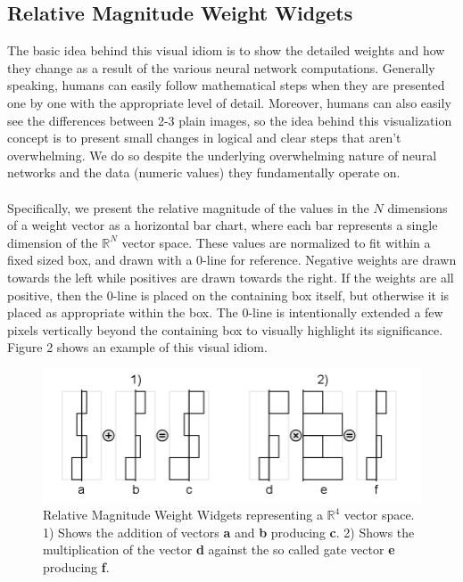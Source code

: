 \documentclass[journal]{vgtc}                %
\begin{document}
\subsection{Relative Magnitude Weight Widgets}
The basic idea behind this visual idiom is to show the detailed weights and how they change as a result of the various neural network computations.
Generally speaking, humans can easily follow mathematical steps when they are presented one by one with the appropriate level of detail.
Moreover, humans can also easily see the differences between 2-3 plain images, so the idea behind this visualization concept is to present small changes in logical and clear steps that aren't overwhelming.
We do so despite the underlying overwhelming nature of neural networks and the data (numeric values) they fundamentally operate on.
\\
\\
Specifically, we present the relative magnitude of the values in the $N$ dimensions of a weight vector as a horizontal bar chart, where each bar represents a single dimension of the $\mathbb{R}^N$ vector space.
These values are normalized to fit within a fixed sized box, and drawn with a 0-line for reference.
Negative weights are drawn towards the left while positives are drawn towards the right.
If the weights are all positive, then the 0-line is placed on the containing box itself, but otherwise it is placed as appropriate within the box.
The 0-line is intentionally extended a few pixels vertically beyond the containing box to visually highlight its significance.
Figure 2 shows an example of this visual idiom.

\begin{figure}[tb]
 \centering %
 \includegraphics[width=\linewidth]{weight_diagram.png}
 \caption{Relative Magnitude Weight Widgets representing a $\mathbb{R}^4$ vector space.  1) Shows the addition of vectors \textbf{a} and \textbf{b} producing \textbf{c}.  2) Shows the multiplication of the vector \textbf{d} against the so called gate vector \textbf{e} producing \textbf{f}.}
 \label{fig:weight_add}
\end{figure}
\end{document}

